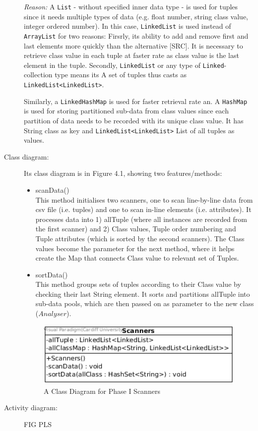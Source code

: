 \begin{description}
\textit{Reason: } A \texttt{List} - without specified inner data type - is used for tuples since it needs multiple types of data (e.g. float number, string class value, integer ordered number). In this case, \texttt{LinkedList} is used instead of \texttt{ArrayList} for two reasons: Firsrly, its ability to add and remove first and last elements more quickly than the alternative [SRC]. It is necessary to retrieve class value in each tuple at faster rate as class value is the last element in the tuple. Secondly, \texttt{LinkedList} or any type of \texttt{Linked}-collection type means its  A set of tuples thus casts as \texttt{LinkedList<LinkedList>}.

Similarly, a \texttt{LinkedHashMap} is used for faster retrieval rate an. A \texttt{HashMap} is used for storing partitioned sub-data from class values since each partition of data needs to be recorded with its unique class value. It has String class as key and \texttt{LinkedList<LinkedList>} List of all tuples as values. 

\item[Class diagram: ] 

Its class diagram is in Figure 4.1, showing two features/methods:
\begin{itemize}
	\item{scanData()} \\
	This method initialises two scanners, one to scan line-by-line data from csv file (i.e. tuples) and one to scan in-line elements (i.e. attributes).
	It processes data into 1) allTuple (where all instances are recorded from the first scanner) and 2) Class values, Tuple order numbering and Tuple attributes (which is sorted by the second scanners).
	The Class values become the parameter for the next method, where it helps create the Map that connects Class value to relevant set of Tuples.
	\item{sortData()} \\
	This method groups sets of tuples according to their Class value by checking their last String element. It sorts and partitions allTuple into sub-data pools, which are then passed on as parameter to the new class ($Analyser$).
	
\end{itemize}

\begin{figure}[!htbp]
    \centering
    \includegraphics[width=5in]{figures/class_scanners}
    \caption[A Class Diagram for Phase I Scanners]{A Class Diagram for Phase I Scanners}
    \label{fig:figure4_2}
\end{figure}

\item[Activity diagram: ] 

FIG PLS

\end{description}

